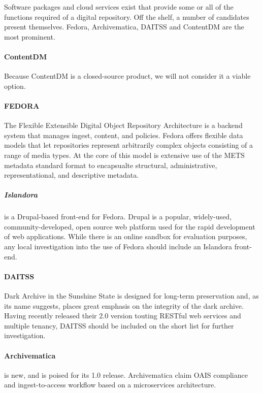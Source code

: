 Software packages and cloud services exist that provide some or all of the functions required of a digital repository. Off the shelf, a number of candidates present themselves. Fedora, Archivematica, DAITSS and ContentDM are the most prominent. 
\paragraph{ContentDM}
Because ContentDM is a closed-source product, we will not consider it a viable option. 
\paragraph{FEDORA}The Flexible Extensible Digital Object Repository Architecture is a backend system that manages ingest, content, and policies. Fedora offers flexible data models that let repositories represent arbitrarily complex objects consisting of a range of media types. At the core of this model is extensive use of the METS metadata standard format to encapsualte structural, administrative, representational, and descriptive metadata\cite{fedora-meta-phil}.
\subparagraph{Islandora} is a Drupal-based front-end for Fedora. Drupal is a popular, widely-used, community-developed, open source web platform used for the rapid development of web applications. While there is an online sandbox\cite{islandora-sandbox} for evaluation purposes, any local investigation into the use of Fedora should include an Islandora front-end.
\paragraph{DAITSS}Dark Archive in the Sunshine State is designed for long-term preservation\cite{daitss} and, as its name suggests, places great emphasis on the integrity of the dark archive. Having recently released their 2.0 version touting RESTful web services and multiple tenancy, DAITSS should be included on the short list for further investigation. 
\paragraph{Archivematica} is new, and is poised for its 1.0 release. Archivematica claim OAIS compliance\cite{archivematica-main} and ingest-to-access workflow based on a microservices architecture.